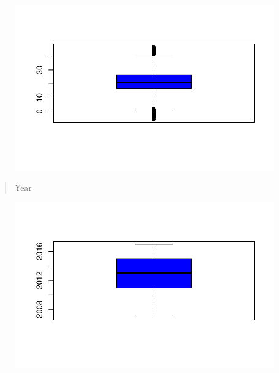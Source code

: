 \documentclass[
  letterpaper,
  DIV=11,
  numbers=noendperiod]{scrartcl}
\newenvironment{Shaded}{\begin{snugshade}}{\end{snugshade}}
\newcommand{\AttributeTok}[1]{\textcolor[rgb]{0.40,0.45,0.13}{#1}}
\newcommand{\FunctionTok}[1]{\textcolor[rgb]{0.28,0.35,0.67}{#1}}
\newcommand{\NormalTok}[1]{\textcolor[rgb]{0.00,0.23,0.31}{#1}}
\newcommand{\SpecialCharTok}[1]{\textcolor[rgb]{0.37,0.37,0.37}{#1}}
\newcommand{\StringTok}[1]{\textcolor[rgb]{0.13,0.47,0.30}{#1}}
\begin{document}
\begin{figure}[H]

{\centering \includegraphics{RainAus_EDA_files/figure-pdf/unnamed-chunk-25-1.pdf}

}

\end{figure}

\begin{quote}
Year
\end{quote}

\begin{Shaded}
\end{Shaded}

\begin{figure}[H]

{\centering \includegraphics{RainAus_EDA_files/figure-pdf/unnamed-chunk-26-1.pdf}

}

\end{figure}
\end{document}
